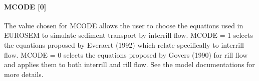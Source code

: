 \paragraph{MCODE [0]}
The value chosen for MCODE allows the user to choose the equations used in EUROSEM to simulate sediment transport by interrill flow.
MCODE = 1 selects the equations proposed by Everaert (1992) which relate specifically to interrill flow. MCODE = 0 selects the equations proposed by Govers (1990) for rill flow and applies them to both interrill and rill flow. See the model documentations for more details.
